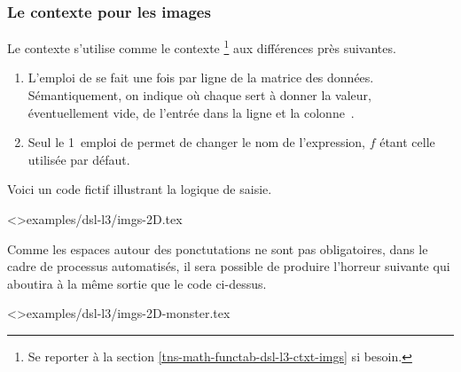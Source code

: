 \documentclass{tutodoc}
\begin{document}

\subsubsection{Le contexte  pour les images}

Le contexte  s'utilise comme le contexte 
\footnote{
    Se reporter à la section \ref{tns-math-functab-dsl-l3-ctxt-imgs} si besoin.
}
aux différences près suivantes.
%
\begin{enumerate}
    \item L'emploi de  se fait une fois par ligne de la matrice des données.
    Sémantiquement, on indique  où chaque  sert à donner la valeur, éventuellement vide, de l'entrée dans la ligne  et la colonne \,.

    \item Seul le 1\ier\ emploi de  permet de changer le nom de l'expression, $f$ étant celle utilisée par défaut.
\end{enumerate}


Voici un code fictif illustrant la logique de saisie.

\tdoclatexinput<>{examples/dsl-l3/imgs-2D.tex}



Comme les espaces autour des ponctutations ne sont pas obligatoires, dans le cadre de processus automatisés, il sera possible de produire l'horreur suivante qui aboutira à la même sortie que le code ci-dessus.

\tdoclatexinput<>{examples/dsl-l3/imgs-2D-monster.tex}
\end{document}
